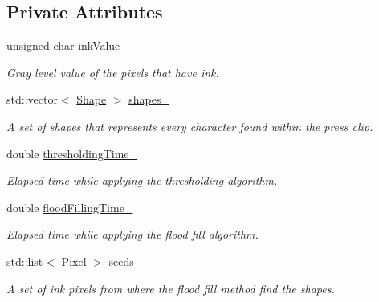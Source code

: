 \subsection*{Private Attributes}
\begin{CompactItemize}
\item 
\hypertarget{class_segmenter_fa6183f99aa6011399783652b341a43b}{
unsigned char \hyperlink{class_segmenter_fa6183f99aa6011399783652b341a43b}{inkValue\_\-}}
\label{class_segmenter_fa6183f99aa6011399783652b341a43b}

\begin{CompactList}\small\item\em Gray level value of the pixels that have ink. \item\end{CompactList}\item 
\hypertarget{class_segmenter_3040cc000907ef44e820ddcf70de6f08}{
std::vector$<$ \hyperlink{class_shape}{Shape} $>$ \hyperlink{class_segmenter_3040cc000907ef44e820ddcf70de6f08}{shapes\_\-}}
\label{class_segmenter_3040cc000907ef44e820ddcf70de6f08}

\begin{CompactList}\small\item\em A set of shapes that represents every character found within the press clip. \item\end{CompactList}\item 
\hypertarget{class_segmenter_13c768c0dfa734bb6ca0c548511bc7bb}{
double \hyperlink{class_segmenter_13c768c0dfa734bb6ca0c548511bc7bb}{thresholdingTime\_\-}}
\label{class_segmenter_13c768c0dfa734bb6ca0c548511bc7bb}

\begin{CompactList}\small\item\em Elapsed time while applying the thresholding algorithm. \item\end{CompactList}\item 
\hypertarget{class_segmenter_9f24d008767ba4741cf3d1e599ee119a}{
double \hyperlink{class_segmenter_9f24d008767ba4741cf3d1e599ee119a}{floodFillingTime\_\-}}
\label{class_segmenter_9f24d008767ba4741cf3d1e599ee119a}

\begin{CompactList}\small\item\em Elapsed time while applying the flood fill algorithm. \item\end{CompactList}\item 
\hypertarget{class_segmenter_48b7c2c842b26bebda9d0fc13cf81e58}{
std::list$<$ \hyperlink{_pixel_8hpp_535e59456e3e633842529cfa8ea103c4}{Pixel} $>$ \hyperlink{class_segmenter_48b7c2c842b26bebda9d0fc13cf81e58}{seeds\_\-}}
\label{class_segmenter_48b7c2c842b26bebda9d0fc13cf81e58}

\begin{CompactList}\small\item\em A set of ink pixels from where the flood fill method find the shapes. \item\end{CompactList}\end{CompactItemize}


